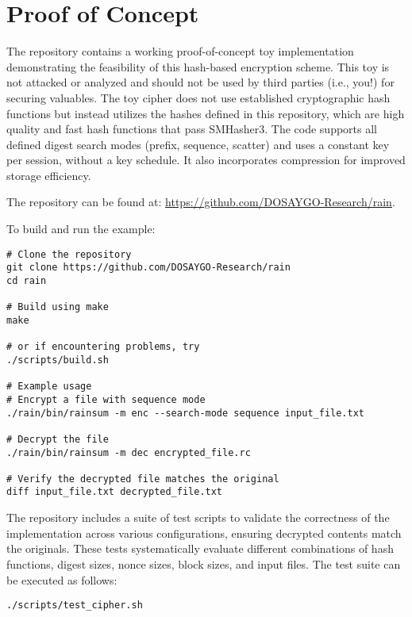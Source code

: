 \documentclass[11pt,a4paper]{article}
\begin{document}
\section*{Proof of Concept}
The repository contains a working proof-of-concept toy implementation demonstrating the feasibility of this hash-based encryption scheme. This toy is not attacked or analyzed and should not be used by third parties (i.e., you!) for securing valuables. The toy cipher does not use established cryptographic hash functions but instead utilizes the hashes defined in this repository, which are high quality and fast hash functions that pass SMHasher3. The code supports all defined digest search modes (prefix, sequence, scatter) and uses a constant key per session, without a key schedule. It also incorporates compression for improved storage efficiency.

The repository can be found at: \url{https://github.com/DOSAYGO-Research/rain}.

To build and run the example:
\begin{verbatim}
# Clone the repository
git clone https://github.com/DOSAYGO-Research/rain
cd rain

# Build using make
make

# or if encountering problems, try
./scripts/build.sh 

# Example usage
# Encrypt a file with sequence mode
./rain/bin/rainsum -m enc --search-mode sequence input_file.txt

# Decrypt the file
./rain/bin/rainsum -m dec encrypted_file.rc

# Verify the decrypted file matches the original
diff input_file.txt decrypted_file.txt
\end{verbatim}

The repository includes a suite of test scripts to validate the correctness of the implementation across various configurations, ensuring decrypted contents match the originals. These tests systematically evaluate different combinations of hash functions, digest sizes, nonce sizes, block sizes, and input files. The test suite can be executed as follows:
\begin{verbatim}
./scripts/test_cipher.sh
\end{verbatim}
\end{document}
